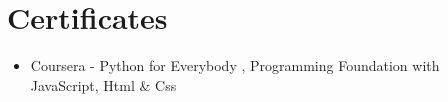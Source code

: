 \documentclass[letterpaper,11pt]{article}
\begin{document}
\section*{Certificates}
\begin{itemize}[leftmargin=*]
    \item Coursera - Python for Everybody  , Programming Foundation with JavaScript, Html \& Css
\end{itemize}
\end{document}
